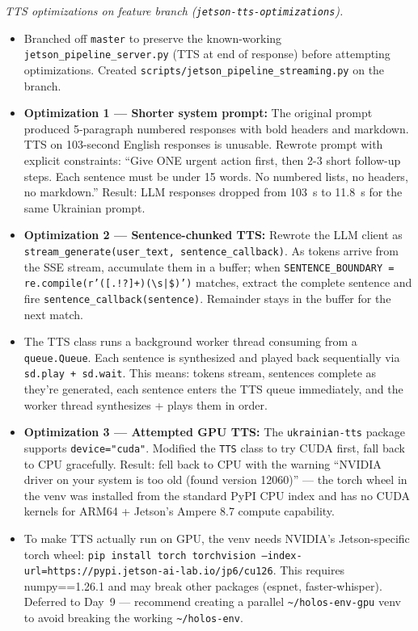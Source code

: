 \documentclass{article}
\theoremstyle{plain}
\theoremstyle{definition}
\theoremstyle{remark}
\begin{document}
\textit{TTS optimizations on feature branch (\texttt{jetson-tts-optimizations}).}
\begin{itemize}
\item Branched off \texttt{master} to preserve the known-working \texttt{jetson\_pipeline\_server.py} (TTS at end of response) before attempting optimizations. Created \texttt{scripts/jetson\_pipeline\_streaming.py} on the branch.
\item \textbf{Optimization 1 --- Shorter system prompt:} The original prompt produced 5-paragraph numbered responses with bold headers and markdown. TTS on 103-second English responses is unusable. Rewrote prompt with explicit constraints: ``Give ONE urgent action first, then 2-3 short follow-up steps. Each sentence must be under 15 words. No numbered lists, no headers, no markdown.'' Result: LLM responses dropped from 103~s to 11.8~s for the same Ukrainian prompt.
\item \textbf{Optimization 2 --- Sentence-chunked TTS:} Rewrote the LLM client as \texttt{stream\_generate(user\_text, sentence\_callback)}. As tokens arrive from the SSE stream, accumulate them in a buffer; when \texttt{SENTENCE\_BOUNDARY = re.compile(r'([.!?]+)(\textbackslash{}s|\$)')} matches, extract the complete sentence and fire \texttt{sentence\_callback(sentence)}. Remainder stays in the buffer for the next match.
\item The TTS class runs a background worker thread consuming from a \texttt{queue.Queue}. Each sentence is synthesized and played back sequentially via \texttt{sd.play + sd.wait}. This means: tokens stream, sentences complete as they're generated, each sentence enters the TTS queue immediately, and the worker thread synthesizes + plays them in order.
\item \textbf{Optimization 3 --- Attempted GPU TTS:} The \texttt{ukrainian-tts} package supports \texttt{device="cuda"}. Modified the \texttt{TTS} class to try CUDA first, fall back to CPU gracefully. Result: fell back to CPU with the warning ``NVIDIA driver on your system is too old (found version 12060)'' --- the torch wheel in the venv was installed from the standard PyPI CPU index and has no CUDA kernels for ARM64 + Jetson's Ampere 8.7 compute capability.
\item To make TTS actually run on GPU, the venv needs NVIDIA's Jetson-specific torch wheel: \texttt{pip install torch torchvision --index-url=https://pypi.jetson-ai-lab.io/jp6/cu126}. This requires numpy==1.26.1 and may break other packages (espnet, faster-whisper). Deferred to Day~9 --- recommend creating a parallel \texttt{\~{}/holos-env-gpu} venv to avoid breaking the working \texttt{\~{}/holos-env}.
\end{itemize}
\end{document}
